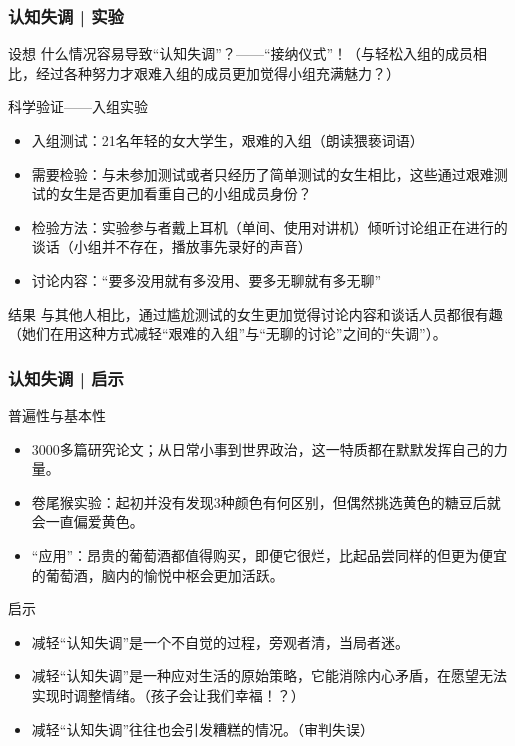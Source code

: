 \begin{frame}
  \frametitle{认知失调 | 实验}
  \begin{block}{设想}
什么情况容易导致“认知失调”？——“接纳仪式”！（与轻松入组的成员相比，经过各种努力才艰难入组的成员更加觉得小组充满魅力？）
  \end{block}
  \vspace{-0.6em}
  \pause
  \begin{block}{科学验证——入组实验}
    \begin{itemize}
      \item 入组测试：21名年轻的女大学生，艰难的入组（朗读猥亵词语）
      \item 需要检验：与未参加测试或者只经历了简单测试的女生相比，这些通过艰难测试的女生是否更加看重自己的小组成员身份？
      \item 检验方法：实验参与者戴上耳机（单间、使用对讲机）倾听讨论组正在进行的谈话（小组并不存在，播放事先录好的声音）
      \item 讨论内容：“要多没用就有多没用、要多无聊就有多无聊”
    \end{itemize}
  \end{block}
  \vspace{-0.6em}
  \pause
  \begin{block}{结果}
与其他人相比，通过尴尬测试的女生更加觉得讨论内容和谈话人员都很有趣（她们在用这种方式减轻“艰难的入组”与“无聊的讨论”之间的“失调”）。
  \end{block}
\end{frame}

\begin{frame}
  \frametitle{认知失调 | 启示}
  \begin{block}{普遍性与基本性}
    \begin{itemize}
      \item 3000多篇研究论文；从日常小事到世界政治，这一特质都在默默发挥自己的力量。
      \item 卷尾猴实验：起初并没有发现3种颜色有何区别，但偶然挑选黄色的糖豆后就会一直偏爱黄色。
      \item “应用”：昂贵的葡萄酒都值得购买，即便它很烂，比起品尝同样的但更为便宜的葡萄酒，脑内的愉悦中枢会更加活跃。
    \end{itemize}
  \end{block}
  \pause
  \begin{block}{启示}
    \begin{itemize}
      \item 减轻“认知失调”是一个不自觉的过程，旁观者清，当局者迷。
      \item 减轻“认知失调”是一种应对生活的原始策略，它能消除内心矛盾，在愿望无法实现时调整情绪。（孩子会让我们幸福！？）
      \item 减轻“认知失调”往往也会引发糟糕的情况。（审判失误）
    \end{itemize}
  \end{block}
\end{frame}

